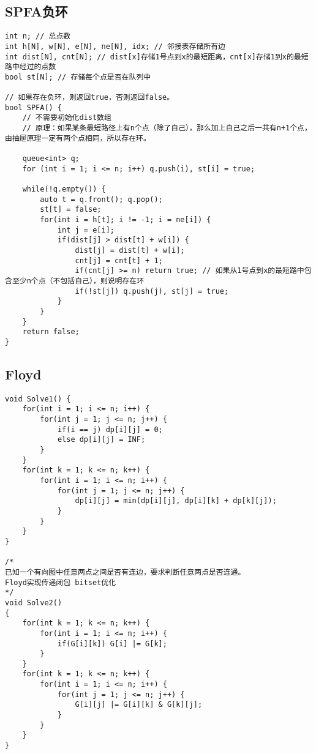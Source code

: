 \subsection{SPFA负环}
\begin{lstlisting}
int n; // 总点数
int h[N], w[N], e[N], ne[N], idx; // 邻接表存储所有边
int dist[N], cnt[N]; // dist[x]存储1号点到x的最短距离，cnt[x]存储1到x的最短路中经过的点数
bool st[N]; // 存储每个点是否在队列中

// 如果存在负环，则返回true，否则返回false。
bool SPFA() {
	// 不需要初始化dist数组
	// 原理：如果某条最短路径上有n个点（除了自己），那么加上自己之后一共有n+1个点，由抽屉原理一定有两个点相同，所以存在环。
	
	queue<int> q;
	for (int i = 1; i <= n; i++) q.push(i), st[i] = true;
	
	while(!q.empty()) {
		auto t = q.front(); q.pop();
		st[t] = false;
		for(int i = h[t]; i != -1; i = ne[i]) {
			int j = e[i];
			if(dist[j] > dist[t] + w[i]) {
				dist[j] = dist[t] + w[i];
				cnt[j] = cnt[t] + 1;
				if(cnt[j] >= n) return true; // 如果从1号点到x的最短路中包含至少n个点（不包括自己），则说明存在环
				if(!st[j]) q.push(j), st[j] = true;
			}
		}
	}
	return false;
}
\end{lstlisting}

\subsection{Floyd}
\begin{lstlisting}
void Solve1() {
	for(int i = 1; i <= n; i++) {
		for(int j = 1; j <= n; j++) {
			if(i == j) dp[i][j] = 0;
			else dp[i][j] = INF;
		}
	}
	for(int k = 1; k <= n; k++) {
		for(int i = 1; i <= n; i++) {
			for(int j = 1; j <= n; j++) {
				dp[i][j] = min(dp[i][j], dp[i][k] + dp[k][j]);
			}
		}
	}
}

/*
已知一个有向图中任意两点之间是否有连边，要求判断任意两点是否连通。
Floyd实现传递闭包 bitset优化 
*/
void Solve2()
{
	for(int k = 1; k <= n; k++) {
		for(int i = 1; i <= n; i++) {
			if(G[i][k]) G[i] |= G[k];
		}
	} 
	for(int k = 1; k <= n; k++) {
		for(int i = 1; i <= n; i++) {
			for(int j = 1; j <= n; j++) {
				G[i][j] |= G[i][k] & G[k][j];
			}
		}
	}
}
\end{lstlisting}

